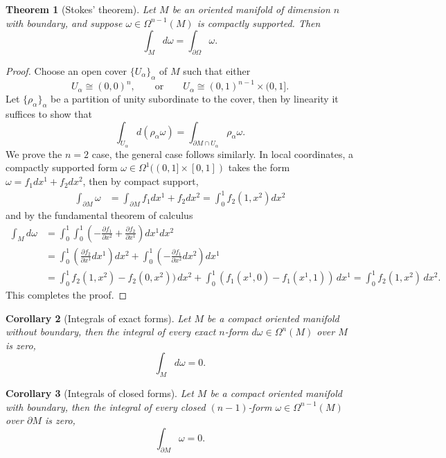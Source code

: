 \documentclass[reqno]{amsart}
\newtheorem{theorem}{Theorem}
\newtheorem{corollary}[theorem]{Corollary}
\theoremstyle{definition}
\theoremstyle{remark}
\begin{document}
\begin{theorem}[Stokes' theorem]
	Let $M$ be an oriented manifold of dimension $n$ with boundary, and suppose $\omega \in \Omega^{n - 1} (M)$ is compactly supported. Then 	
		\[ \int_M d \omega = \int_{\partial \Omega} \omega. \]
\end{theorem}

\begin{proof}
	Choose an open cover $\{U_\alpha \}_\alpha$ of $M$ such that either 
		\[ U_\alpha \cong (0, 0)^n, \qquad \text{or} \qquad U_\alpha \cong (0, 1)^{n - 1} \times (0, 1]. \]
	Let $\{\rho_\alpha\}_\alpha$ be a partition of unity subordinate to the cover, then by linearity it suffices to show that 
		\[ \int_{U_\alpha} d(\rho_\alpha \omega) = \int_{\partial M \cap U_\alpha} \rho_\alpha \omega. \]
	We prove the $n = 2$ case, the general case follows similarly. In local coordinates, a compactly supported form $\omega \in \Omega^1 ((0, 1] \times [0, 1])$ takes the form $\omega = f_1 dx^1 + f_2 dx^2$, then by compact support, 
		\begin{align*}
			\int_{\partial M} \omega 
				&= \int_{\partial M} f_1 dx^1 + f_2 dx^2 = \int_0^1 f_2 (1, x^2) dx^2
		\end{align*}
	and by the fundamental theorem of calculus	
		\begin{align*}		
			\int_M d \omega
				&= \int_0^1 \int_0^1 \left( - \frac{\partial f_1}{\partial x^2} + \frac{\partial f_2}{\partial x^1} \right) dx^1 dx^2	\\
				&= \int_0^1 \left( \frac{\partial f_2}{\partial x^1} dx^1 \right) dx^2 + \int_0^1 \left( - \frac{\partial f_1}{\partial x^2} dx^2 \right) dx^1 \\
				&= \int_0^1 f_2 (1, x^2) - f_2 (0, x^2)) \, dx^2 + \int_0^1 (f_1 (x^1, 0) - f_1 (x^1, 1)) \, dx^1 = \int_0^1 f_2 (1, x^2) \, dx^2. 
		\end{align*}		
	This completes the proof. 	
\end{proof}

\begin{corollary}[Integrals of exact forms]
	Let $M$ be a compact oriented manifold without boundary, then the integral of every exact $n$-form $d \omega \in \Omega^n (M)$ over $M$ is zero, 
		\[ \int_M d \omega = 0. \]
\end{corollary}

\begin{corollary}[Integrals of closed forms]
	Let $M$ be a compact oriented manifold with boundary, then the integral of every closed $(n - 1)$-form $\omega \in \Omega^{n - 1} (M)$ over $\partial M$ is zero, 
		\[ \int_{\partial M} \omega = 0. \]
\end{corollary}
\end{document}
